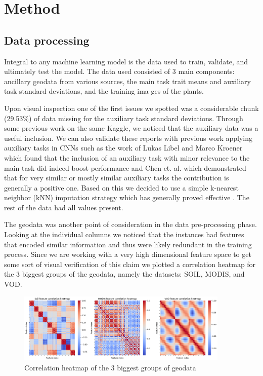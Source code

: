 \documentclass[12pt,a4paper,oneside]{article}
\begin{document}

\section{Method}

\subsection{Data processing}

Integral to any machine learning model is the data used to train, validate, and ultimately test the model. The data used consisted of 3 main components: ancillary geodata from various sources, the main task trait means and auxiliary task standard deviations, and the training ima ges of the plants.

\smallskip 
Upon visual inspection one of the first issues we spotted was a considerable chunk (29.53\%) of data missing for the auxiliary task standard deviations. Through some previous work on the same Kaggle, we noticed that the auxiliary data was a useful inclusion. We can also validate these reports with previous work applying auxiliary tasks in CNNs such as the work of Lukas Libel and Marco Kroener which found that the inclusion of an auxiliary task with minor relevance to the main task did indeed boost performance \cite{lukaslibel} and Chen et. al. \cite{pmlr-v80-chen18a} which demonstrated that for very similar or mostly similar auxiliary tasks the contribution is generally a positive one. Based on this we decided to use a simple k-nearest neighbor (kNN) imputation strategy which has generally proved effective \cite{joel2024performance}. The rest of the data had all values present.

\smallskip
The geodata was another point of consideration in the data pre-processing phase. Looking at the individual columns we noticed that the instances had features that encoded similar information and thus were likely redundant in the training process. Since we are working with a very high dimensional feature space to get some sort of visual verification of this claim we plotted a correlation heatmap for the 3 biggest groups of the geodata, namely the datasets: SOIL, MODIS, and VOD.

\begin{figure}[!h]
    \centering
    \includegraphics[width=0.9\textwidth]{assets/corr_hm.png}
    \caption{Correlation heatmap of the 3 biggest groups of geodata}
\end{figure}
\end{document}
